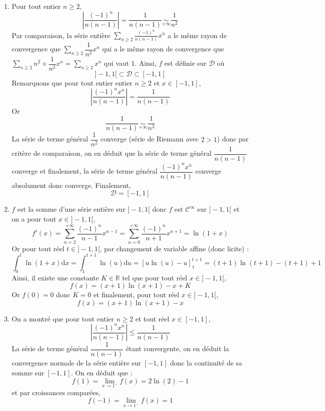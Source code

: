 \documentclass[a4paper,twoside,french,11pt]{VcCours}
\newcommand{\dx}{\text{d}x}
\newcommand{\Sum}[2]{\sum_{#1}^{#2}}
\begin{document}
  
  \begin{enumerate}
  \item Pour tout entier $n \geq 2$,
  $$ \left\vert \frac{( - 1)^{n}}{n(n - 1)} \right\vert = \dfrac{1}{n(n-1)} \underset{+ \infty}{\sim} \dfrac{1}{n^2}$$
Par comparaison, la série entière $\Sum{n \geq 2}{} \frac{( - 1)^{n}}{n(n - 1)}x^{n}$ a le même rayon de convergence que $\Sum{n \geq 2}{} \dfrac{1}{n^2}x^{n}$ qui a le même rayon de convergence que $\Sum{n \geq 2}{} n^2 \times \dfrac{1}{n^2} x^{n} = \Sum{n \geq 2}{} x^n$ qui vaut $1$. Ainsi, $f$ est définie sur $\mathcal{D}$ où
$$ ]-1,1[ \subset \mathcal{D} \subset [-1,1]$$
Remarquons que pour tout entier entier $n \geq 2$ et $x \in [-1,1]$,
$$ \left\vert \dfrac{(-1)^n x^n }{n(n-1)} \right\vert = \dfrac{1}{n(n-1)} $$
Or 
$$ \dfrac{1}{n(n-1)} \underset{+ \infty}{\sim} \dfrac{1}{n^2}$$
La série de terme général $\dfrac{1}{n^2}$ converge (série de Riemann avec $2>1$) donc par critère de comparaison, on en déduit que la série de terme général $\dfrac{1}{n(n-1)}$ converge et finalement, la série de terme général $ \dfrac{(-1)^n x^n }{n(n-1)}$ converge absolument donc converge. Finalement,
$$ \mathcal{D} = [-1,1]$$
\item $f$ est la somme d'une série entière sur $]-1,1[$ donc $f$ est $\mathcal{C}^{\infty}$ sur $]-1,1[$ et on a pour tout $x \in ]-1,1[$,
$$ f'(x) = \sum_{n=2}^{+ \infty} \dfrac{(-1)^n}{n-1} x^{n-1} =  \sum_{n=0}^{+ \infty} \dfrac{(-1)^{n}}{n+1} x^{n+1} = \ln(1+x)$$
Or pour tout réel $t \in ]-1,1[$, par changement de variable affine (donc licite) :
$$ \int_0^t \ln(1+x) \dx = \int_1^{t+1} \ln(u) \textrm{d}u = \left[ u \ln(u)-u \right]_1^{t+1} = (t+1)\ln(t+1)-(t+1) +1$$
Ainsi, il existe une constante $K \in \mathbb{R}$ tel que pour tout réel $x \in ]-1,1[$,
$$ f(x) = (x+1) \ln(x+1) - x + K$$
Or $f(0)=0$ donc $K=0$ et finalement, 
pour tout réel $x \in ]-1,1[$,
$$ f(x) = (x+1) \ln(x+1) - x $$
  \item On a montré que pour tout entier $n \geq 2$ et tout réel $x \in [-1,1]$,
  $$ \left\vert \frac{( - 1)^{n} x^n}{n(n - 1)} \right\vert \leq \dfrac{1}{n(n-1)}$$
La série de terme général $\dfrac{1}{n(n-1)}$ étant convergente, on en déduit la convergence normale de la série entière sur $[-1,1]$ donc la continuité de sa somme sur $[-1,1]$. On en déduit que :
$$ f(1) = \lim_{x \rightarrow 1^{-}} f(x) =  2 \ln(2)-1$$
et par croissances comparées,
$$ f(-1) = \lim_{x \rightarrow 1^{-}} f(x) =  1$$
  \end{enumerate}
  
\end{document}
